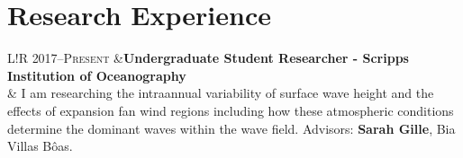 \documentclass[10pt]{article}
\newcommand\VRule{\color{lightgray}\vrule width 0.5pt}
\begin{document}
\section*{Research Experience}
\vspace{.3cm}
\begin{tabular}{L!{\VRule}R}
\textsc{2017--Present} &{\bf Undergraduate Student Researcher - Scripps Institution of Oceanography }\\
& I am researching the intraannual variability of surface wave height and the effects of expansion fan wind regions including how these atmospheric conditions determine the dominant waves within the wave field. Advisors: \textbf{Sarah Gille}, Bia Villas B\^{o}as.\\[5pt]
\end{tabular}


\vspace{.3cm}
\end{document}
